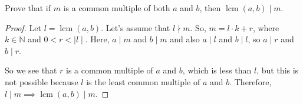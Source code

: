 \documentclass[12pt]{article}
\newenvironment{exercise}[2][Exercise]{\begin{trivlist}
\item[\hskip \labelsep {\bfseries #1}\hskip \labelsep {\bfseries #2.}]}{\end{trivlist}}
\DeclareMathOperator{\lcm}{lcm}
\begin{document}
\begin{exercise}{13}
Prove that if \( m \) is a common multiple of both \( a \) and \( b \), then \( \lcm(a, b) \mid m \).
\end{exercise}

\begin{proof}
Let \( l = \lcm(a, b) \). Let's assume that \( l \nmid m \).  So, \( m = l \cdot k + r \), where \( k \in \mathbb{N} \) and \( 0 < r < \mid l \mid \).  Here, \( a \mid m \) and \( b \mid m \) and also \( a \mid l \) and \( b \mid l \), so \( a \mid r \) and \( b \mid r \). 

So we see that \( r \) is a common multiple of \( a \) and \( b \), which is less than \( l \), but this is not possible because $l$ is the least common multiple of $a$ and $b$. Therefore, \( l \mid m \implies \lcm(a, b) \mid m \).
\end{proof}














 
\end{document}
